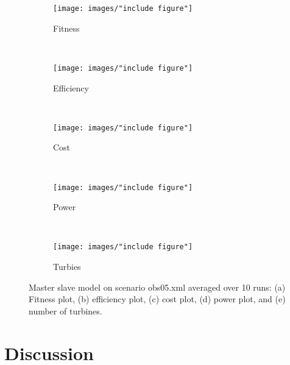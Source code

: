 \begin{figure}[h!]
    \centering
      \begin{subfigure}[b]{0.31\textwidth}
        \texttt{[image: images/"include figure"]}
        \caption{Fitness}
        \hfill
        \label{plot:master slave model fitness plot scenario obs 05}
    \end{subfigure}
    ~
      \begin{subfigure}[b]{0.31\textwidth}
        \texttt{[image: images/"include figure"]}
        \caption{Efficiency}
        \hfill
        \label{plot:single point crossover}
    \end{subfigure}
    ~
    \begin{subfigure}[b]{0.31\textwidth}
        \texttt{[image: images/"include figure"]}
        \caption{Cost}
        \hfill
        \label{plot:single point crossover}
    \end{subfigure}
    ~
    \begin{subfigure}[b]{0.31\textwidth}
        \texttt{[image: images/"include figure"]}
        \caption{Power}
        \hfill
        \label{plot:two point crossover}
    \end{subfigure}
    ~
    \begin{subfigure}[b]{0.31\textwidth}
        \texttt{[image: images/"include figure"]}
        \caption{Turbies}
        \hfill
        \label{plot:uniform crossover}
    \end{subfigure}
    \caption{Master slave model on scenario obs05.xml averaged over 10 runs: (a) Fitness plot, (b) efficiency plot, (c) cost plot, (d) power plot, and (e) number of turbines.}
    \label{plot:master slave scenario obs 05}
\end{figure}


\section{Discussion}\label{section:discussion}